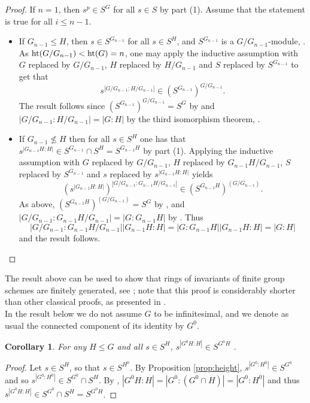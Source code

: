 \documentclass[12pt]{amsart}
\newtheorem{corollary}[theorem]{Corollary}
\theoremstyle{definition}
\begin{document}
\begin{proof}
	If $n=1$, then $s^p\in S^G$ for all $s\in S$ by part (1). Assume that the statement is true for all $i\leq n-1$.
	\begin{itemize}
		\item If $G_{n-1}\leq H$, then $s\in S^{G_{n-1}}$ for all $s\in S^H$, and $S^{G_{n-1}}$ is a $G/G_{n-1}$-module, \cite[I.6.4]{MR2015057}. As ${\rm ht}(G/G_{n-1})<{\rm ht}(G)=n$, one may apply the inductive assumption with $G$ replaced by  $G/G_{n-1}$, $H$ replaced by $H/G_{n-1}$ and $S$ replaced by $S^{G_{n-1}}$ to get that
		\[
		s^{|G/G_{n-1}{:}H/G_{n-1}|}\in (S^{G_{n-1}})^{G/G_{n-1}}.
		\]
		The result follows since $(S^{G_{n-1}})^{G/G_{n-1}}=S^G$ by \cite[I.6.4]{MR2015057} and  $|G/G_{n-1}{:}H/G_{n-1}|=|G{:}H|$ by the third isomorphism theorem, \cite[5.55]{MR3729270}.
		\item If $G_{n-1}\nleq H$ then for all $s\in S^H$ one has that $s^{|G_{n-1}H{:}H|}\in S^{G_{n-1}}\cap S^{H}=S^{G_{n-1}H}$ by part (1). Applying the inductive assumption with $G$ replaced by $G/G_{n-1}$, $H$ replaced by $G_{n-1}H/G_{n-1}$, $S$ replaced by $S^{G_{n-1}}$ and $s$ replaced by $s^{|G_{n-1}H{:}H|}$ yields
		\[
		\left(s^{|G_{n-1}H{:}H|}\right)^{|G/G_{n-1}{:}G_{n-1}H/G_{n-1}|}\in (S^{G_{n-1}H})^{(G/G_{n-1})}.
		\]
		As above, $(S^{G_{n-1}H})^{(G/G_{n-1})}=S^G$ by \cite[I.6.4]{MR2015057}, and $|G/G_{n-1}{:}G_{n-1}H/G_{n-1}|=|G{:}G_{n-1}H|$ by \cite[5.55]{MR3729270}. Thus $$|G/G_{n-1}{:}G_{n-1}H/G_{n-1}||G_{n-1}H{:}H|=|G:G_{n-1}H||G_{n-1}H{:}H|=|G{:}H|$$ and the result follows.
	\end{itemize}
\end{proof}

The result above can be used to show that rings of invariants of finite group schemes are finitely generated, see \cite[2.9]{MR4692505}; note that this proof is considerably shorter than other classical proofs, as presented in \cite[\S4.2]{MR1243637}.\\

In the result below we do not assume $G$ to be infinitesimal, and we denote as usual the connected component of its identity by $G^0$.
\begin{corollary}\label{cor:height}
	For any $H\leq G$ and all $s\in S^H$, $s^{|G^0H{:}H|}\in S^{G^0H}$ .
\end{corollary}
\begin{proof}
	Let $s\in S^H$, so that $s\in S^{H^0}$. By Proposition \ref{prop:height}, $s^{|G^0{:}H^0|}\in S^{G^0}$ and so $s^{|G^0{:}H^0|}\in S^{G^0}\cap S^H$. By \cite[I.6.2(3)]{MR2015057}, $|G^0H{:}H|=|G^0{:}(G^0\cap H)|=|G^0{:}H^0|$ and thus $s^{|G^0H{:}H|}\in S^{G^0}\cap S^H=S^{G^0H}$.
\end{proof}
\end{document}
